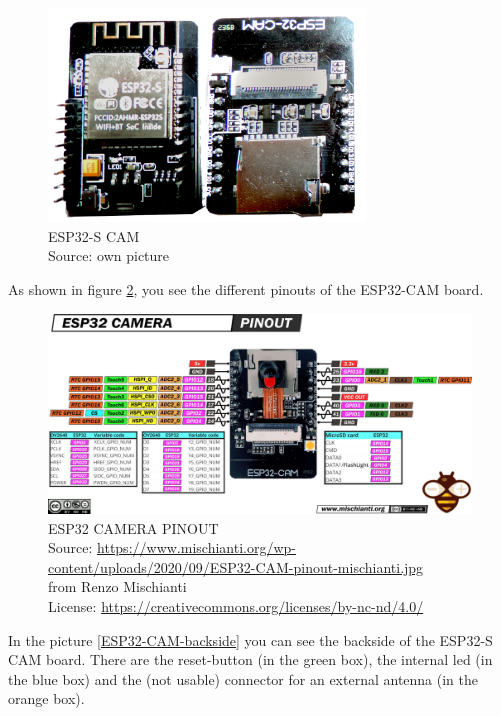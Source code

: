 \begin{figure}[H]
\centering
\includegraphics[width=0.75\textwidth]{esp32-s_overview}
\caption[ESP32-S-CAM Overview]{ESP32-S CAM \\ Source: own picture}
\label{ESP32-S-CAM-overview}
\end{figure}

As shown in figure \ref{ESP32-CAM-pinout}, you see the different pinouts of the ESP32-CAM board.

\begin{figure}[H]
\centering
\includegraphics[width=\textwidth]{ESP32-CAM-pinout-mischianti}
\caption[ESP32 CAMERA PINOUT Overview]{ESP32 CAMERA PINOUT \\ Source: \url{https://www.mischianti.org/wp-content/uploads/2020/09/ESP32-CAM-pinout-mischianti.jpg}\\ from Renzo Mischianti \\ License: \url{https://creativecommons.org/licenses/by-nc-nd/4.0/}}
\label{ESP32-CAM-pinout}
\end{figure}

In the picture \ref{ESP32-CAM-backside} you can see the backside of the ESP32-S CAM board. There are the reset-button (in the green box), the internal led (in the blue box) and the (not usable) connector for an external antenna (in the orange box).

